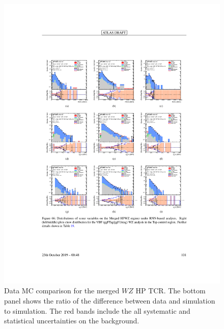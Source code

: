 \begin{figure}[h!]
  \centering
  \includegraphics[width=\hsize , height=\textheight , keepaspectratio]{figures/Analysis/datamc/merged_hp_wz_tcr.pdf}
    \caption{Data MC comparison for the merged $WZ$ HP TCR. The bottom panel shows the ratio of the difference between data and simulation to simulation. The red bands include the all systematic and statistical uncertainties on the background. } 
  \label{fig:merged_hp_wz_TCR_datamc}
\end{figure} 
\FloatBarrier


